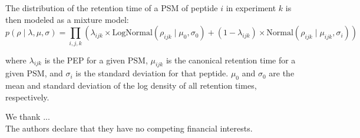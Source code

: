 \begin{spacing}{1.55}
The distribution of the retention time of a PSM of peptide $i$ in experiment $k$ is then modeled as a mixture model:
\[ p(\rho\;\vert\;\lambda,\mu,\sigma) =  \prod_{i,j,k}^{} ( \lambda_{ijk} \times \text{LogNormal}(\rho_{ijk}\;\vert\;\mu_{0},\sigma_{0})  + (1-\lambda_{ijk}) \times \text{Normal}(\rho_{ijk}\;\vert\;\mu_{ijk},\sigma_{i}) ) \]

where $\lambda_{ijk}$ is the PEP for a given PSM, $\mu_{ijk}$ is the canonical retention time for a given PSM, and $\sigma_{i}$ is the standard deviation for that peptide. $\mu_{0}$ and $\sigma_{0}$ are the mean and standard deviation of the log density of all retention times, respectively.

\bigskip

 We thank ...\\
 
 The authors declare that they have no
competing financial interests.\\
 
 \\






\printbibliography

\end{spacing}

